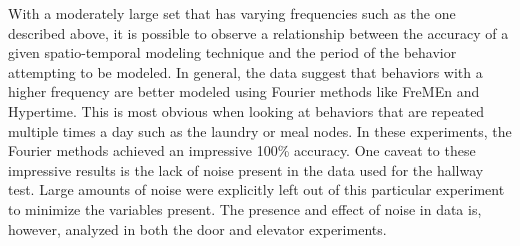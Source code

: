 With a moderately large set that has varying frequencies such as the one
described above, it is possible to observe a relationship between the accuracy
of a given spatio-temporal modeling technique and the period of the behavior
attempting to be modeled. In general, the data suggest that behaviors with
a higher frequency are better modeled using Fourier methods like FreMEn and
Hypertime. This is most obvious when looking at behaviors that are repeated multiple
times a day such as the laundry or meal nodes. In these experiments, the Fourier
methods achieved an impressive 100\% accuracy.
One caveat to these impressive results is the lack of noise
present in the data used for the hallway test. Large amounts of noise were
explicitly left out of this particular experiment to minimize the variables
present. The presence and effect of noise in data is, however, analyzed in
both the door and elevator experiments. \\

\begin{table}[h!]
  \centering
  \caption{Hallway Laundry Section}
\end{table}

\begin{table}[h!]
  \centering
  \caption{Hallway Meal Section 0}
\end{table}

